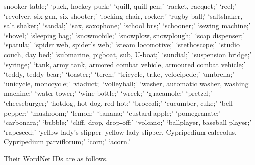 \documentclass[10pt,twocolumn,letterpaper]{article}
\begin{document}
snooker table;' `puck, hockey puck;' `quill, quill pen;' `racket, racquet;' `reel;' `revolver, six-gun, six-shooter;' `rocking chair, rocker;' `rugby ball;' `saltshaker, salt shaker;' `sandal;' `sax, saxophone;' `school bus;' `schooner;' `sewing machine;' `shovel;' `sleeping bag;' `snowmobile;' `snowplow, snowplough;' `soap dispenser;' `spatula;' `spider web, spider's web;' `steam locomotive;' `stethoscope;' `studio couch, day bed;' `submarine, pigboat, sub, U-boat;' `sundial;' `suspension bridge;' `syringe;' `tank, army tank, armored combat vehicle, armoured combat vehicle;' `teddy, teddy bear;' `toaster;' `torch;' `tricycle, trike, velocipede;' `umbrella;' `unicycle, monocycle;' `viaduct;' `volleyball;' `washer, automatic washer, washing machine;' `water tower;' `wine bottle;' `wreck;' `guacamole;' `pretzel;' `cheeseburger;' `hotdog, hot dog, red hot;' `broccoli;' `cucumber, cuke;' `bell pepper;' `mushroom;' `lemon;' `banana;' `custard apple;' `pomegranate;' `carbonara;' `bubble;' `cliff, drop, drop-off;' `volcano;' `ballplayer, baseball player;' `rapeseed;' `yellow lady's slipper, yellow lady-slipper, Cypripedium calceolus, Cypripedium parviflorum;' `corn;' `acorn.'


Their WordNet IDs are as follows.
\end{document}
